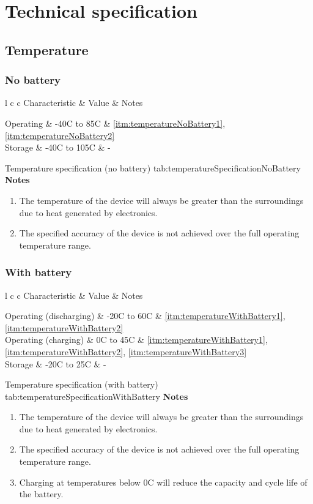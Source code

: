 \section{Technical specification}

\newcommand{\characteristicTable}[4]{
    \customTable
    {l c c}
    {Characteristic & Value & Notes}
    {
        #1
    }
    {#2}
    {#3}
    \textbf{Notes}
    \begin{enumerate}[nolistsep]
        #4
    \end{enumerate}
}

\subsection{Temperature}
\label{sec:temperature}

\newcommand{\noteHeat}{The temperature of the device will always be greater than the surroundings due to heat generated by electronics.}

\newcommand{\noteFullRange}{The specified accuracy of the device is not achieved over the full operating temperature range.  }

\subsubsection{No battery}

\characteristicTable
{
    Operating & -40\textdegree{}C to 85\textdegree{}C & \ref{itm:temperatureNoBattery1}, \ref{itm:temperatureNoBattery2}\\
    Storage & -40\textdegree{}C to 105\textdegree{}C & -\\
}
{Temperature specification (no battery)}
{tab:temperatureSpecificationNoBattery}
{
    \item \label{itm:temperatureNoBattery1} \noteHeat
    \item \label{itm:temperatureNoBattery2} \noteFullRange
}

\subsubsection{With battery}

\characteristicTable
{
    Operating (discharging) & -20\textdegree{}C to 60\textdegree{}C & \ref{itm:temperatureWithBattery1}, \ref{itm:temperatureWithBattery2}\\
    Operating (charging) & 0\textdegree{}C to 45\textdegree{}C & \ref{itm:temperatureWithBattery1}, \ref{itm:temperatureWithBattery2}, \ref{itm:temperatureWithBattery3}\\
    Storage & -20\textdegree{}C to 25\textdegree{}C & -\\
}
{Temperature specification (with battery)}
{tab:temperatureSpecificationWithBattery}
{
    \item \label{itm:temperatureWithBattery1} \noteHeat
    \item \label{itm:temperatureWithBattery2} \noteFullRange
    \item \label{itm:temperatureWithBattery3} Charging at temperatures below 0\textdegree{}C will reduce the capacity and cycle life of the battery.
}

